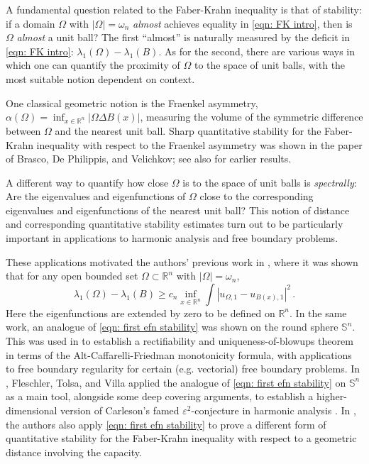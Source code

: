 \documentclass[10pt, reqno]{amsart}
\numberwithin{equation}{section}
\def\R{{\mathbb R}}
\def\e{\varepsilon}
\def\W{\Omega}
\begin{document}
A fundamental question related to the Faber-Krahn inequality is that of stability: if a domain $\W$ with $|\W| = \omega_n$ {\it almost} achieves equality in \eqref{eqn: FK intro}, then is $\W$ {\it almost} a unit ball? The first ``almost'' is naturally measured by the deficit in \eqref{eqn: FK intro}: $\lambda_1(\W)  - \lambda_1(B)$. As for the second,  there are various ways in which one can quantify the proximity of $\W$ to the space of unit balls,  with the most suitable  notion dependent on context.

One classical geometric notion is the Fraenkel asymmetry, $\alpha(\W) = \inf_{x \in \R^n} |\W\Delta B(x)|$, measuring the volume of the symmetric difference between $\W$ and the nearest unit ball. Sharp quantitative stability for the Faber-Krahn inequality with respect to the Fraenkel asymmetry was shown  in the paper \cite{BDV15} of Brasco, De Philippis, and Velichkov;  see also \cite{Bhat01, FMP09} for earlier results.

A different way to quantify how close $\W$ is to the space of unit balls
is {\it spectrally}: Are the eigenvalues and eigenfunctions of $\W$ close to the corresponding eigenvalues and eigenfunctions of the nearest unit ball? 
This notion of distance and corresponding quantitative stability estimates  turn out to be particularly important in applications to harmonic analysis and free boundary problems.

These applications motivated the authors' previous work in \cite{AKN1, AKN2}, where it was  shown that for any open bounded set $\W \subset \R^n$ with $|\W|  =\omega_n$,
\begin{equation}\label{eqn: first efn stability}
\lambda_1(\W ) - \lambda_1(B) \geq c_n \inf_{x \in\R^n} \int |u_{\W,1 } - u_{B(x), 1}|^2 \,.
\end{equation}
Here the eigenfunctions are extended by zero to be defined on $\R^n$.
In the same work, an analogue of \eqref{eqn: first efn stability} was shown on the round sphere $\mathbb{S}^n$. This was used in \cite{AKN3} to establish a rectifiability and uniqueness-of-blowups theorem in terms of the Alt-Caffarelli-Friedman monotonicity formula, with applications to free boundary regularity for certain (e.g. vectorial) free boundary problems. In \cite{FTV1, FTV2}, Fleschler, Tolsa, and Villa applied the analogue of \eqref{eqn: first efn stability} on $\mathbb{S}^n$ as a main tool, alongside  some deep covering arguments, to establish a higher-dimensional version of Carleson's famed $\e^2$-conjecture in harmonic analysis \cite{JTV21}. In \cite{FTV1}, the authors also apply \eqref{eqn: first efn stability} to prove a different form of quantitative stability for the Faber-Krahn inequality with respect to a geometric distance involving the capacity.
\end{document}
